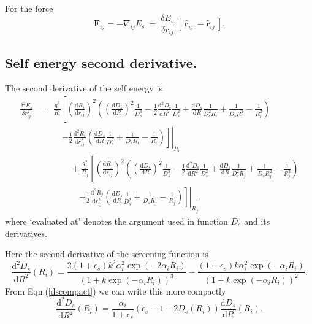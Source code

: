 \documentclass[a4paper,11pt,oneside]{article}
\begin{document}
For the force
\begin{equation}
\mathbf{F}_{ij} = -\nabla_{ij}E_s ~=~ \frac{\delta E_s}{\delta r_{ij}} ~[~\hat{\mathbf{r}}_{ij} ~ -\hat{\mathbf{r}}_{ij}~].
\end{equation}


\subsection*{Self energy second derivative.}
The second derivative of the self energy is
\begin{eqnarray}
\nonumber\frac{\delta^2 E_s}{\delta r_{ij}^2} &=&
\frac{q_i^2}{R_i}\left[
\left(\frac{\mathrm{d}R_i}{\mathrm{d}r_{ij}}\right)^2\left(
\left(\frac{\mathrm{d}D_s}{\mathrm{d}R}\right)^2\frac{1}{D_s^3}
-\frac{1}{2}\frac{\mathrm{d}^2D_s}{\mathrm{d}R^2}\frac{1}{D_s^2}
+\frac{\mathrm{d}D_s}{\mathrm{d}R}\frac{1}{D_s^2R_i}
+\frac{1}{D_sR_i^2}-\frac{1}{R_i^2}
\right)\right.\\
\nonumber&&\quad\left.\left.-\frac{1}{2}\frac{\mathrm{d}^2R_i}{\mathrm{d}r_{ij}^2}
\left(
\frac{\mathrm{d}D_s}{\mathrm{d}R}\frac{1}{D_s^2}
+\frac{1}{D_sR_i}
-\frac{1}{R_i}
\right)
\right]\right|_{R_i}\\
\nonumber&&\quad\quad+\frac{q_j^2}{R_j}\left[
\left(\frac{\mathrm{d}R_j}{\mathrm{d}r_{ij}}\right)^2\left(
\left(\frac{\mathrm{d}D_s}{\mathrm{d}R}\right)^2\frac{1}{D_s^3}
-\frac{1}{2}\frac{\mathrm{d}^2D_s}{\mathrm{d}R^2}\frac{1}{D_s^2}
+\frac{\mathrm{d}D_s}{\mathrm{d}R}\frac{1}{D_s^2R_j}
+\frac{1}{D_sR_j^2}-\frac{1}{R_j^2}
\right)\right.\\
&&\quad\quad\quad\left.\left.-\frac{1}{2}\frac{\mathrm{d}^2R_j}{\mathrm{d}r_{ij}^2}
\left(
\frac{\mathrm{d}D_s}{\mathrm{d}R}\frac{1}{D_s^2}
+\frac{1}{D_sR_j}
-\frac{1}{R_j}
\right)
\right]\right|_{R_j},
\end{eqnarray}
where `evaluated at' denotes the argument used in function $D_s$ and its derivatives.

Here the second derivative of the screening function is
\begin{equation}
\frac{\mathrm{d}^2D_s}{\mathrm{d}R^2}(R_i) = \frac{2(1+\epsilon_s)k^2\alpha_i^2\exp(-2\alpha_iR_i)}{\left(1+k\exp(-\alpha_iR_i)\right)^3} -
\frac{(1+\epsilon_s)k\alpha_i^2\exp(-\alpha_iR_i)}{\left(1+k\exp(-\alpha_iR_i)\right)^2}.
\end{equation}
From Eqn.(\ref{dscompact}) we can write this more compactly
\begin{equation}
\frac{\mathrm{d}^2D_s}{\mathrm{d}R^2}(R_i) = \frac{\alpha_i}{1+\epsilon_s}
\left(\epsilon_s-1-2D_s(R_i)\right)\frac{\mathrm{d}D_s}{\mathrm{d}R}(R_i).
\end{equation}
\end{document}

